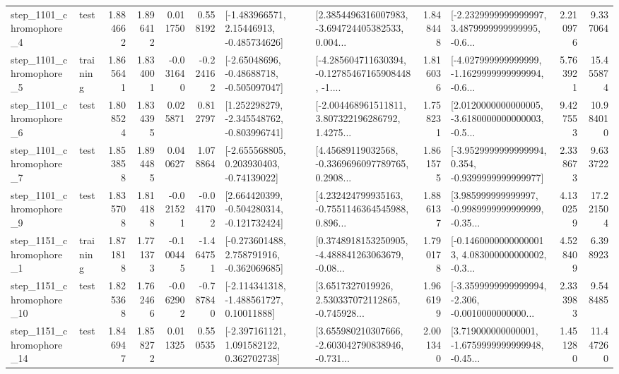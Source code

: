 \begin{tabular}{llrrrrllrlrr}
  step\_1101\_chromophore\_4 &      test &      1.884662 &    1.896412 &      0.011750 &  0.558192 &    [-1.483966571, 2.15446913, -0.485734626] &  [2.3854496316007983, -3.694724405382533, 0.004... &       1.848448 &  [-2.2329999999999997, 3.4879999999999995, -0.6... &            2.210976 &          9.337064 \\
  step\_1101\_chromophore\_5 &  training &      1.865641 &    1.834001 &     -0.031640 & -0.224162 &    [-2.65048696, -0.48688718, -0.505097047] &  [-4.285604711630394, -0.12785467165908448, -1.... &       1.816036 &  [-4.027999999999999, -1.1629999999999994, -0.6... &            5.763921 &         15.455874 \\
  step\_1101\_chromophore\_6 &      test &      1.808524 &    1.834395 &      0.025871 &  0.812797 &   [1.252298279, -2.345548762, -0.803996741] &  [-2.004468961511811, 3.807322196286792, 1.4275... &       1.758231 &  [2.0120000000000005, -3.6180000000000003, -0.5... &            9.427553 &         10.984010 \\
  step\_1101\_chromophore\_7 &      test &      1.853858 &    1.894485 &      0.040627 &  1.078864 &    [-2.655568805, 0.203930403, -0.74139022] &  [4.45689119032568, -0.3369696097789765, 0.2908... &       1.861575 &  [-3.9529999999999994, 0.354, -0.9399999999999977] &            2.338673 &          9.633722 \\
  step\_1101\_chromophore\_9 &      test &      1.835708 &    1.814188 &     -0.021521 & -0.041702 &   [2.664420399, -0.504280314, -0.121732424] &  [4.232424799935163, -0.7551146364545988, 0.896... &       1.886137 &  [3.985999999999997, -0.9989999999999999, -0.35... &            4.130259 &         17.221504 \\
  step\_1151\_chromophore\_1 &  training &      1.871818 &    1.771373 &     -0.100445 & -1.464751 &   [-0.273601488, 2.758791916, -0.362069685] &  [0.3748918153250905, -4.488841263063679, -0.08... &       1.790178 &  [-0.14600000000000013, 4.083000000000002, -0.3... &            4.528409 &          6.398923 \\
 step\_1151\_chromophore\_10 &      test &      1.825368 &    1.762466 &     -0.062902 & -0.787840 &    [-2.114341318, -1.488561727, 0.10011888] &  [3.6517327019926, 2.530337072112865, -0.745928... &       1.966199 &  [-3.3599999999999994, -2.306, -0.0010000000000... &            2.333983 &          9.548485 \\
 step\_1151\_chromophore\_14 &      test &      1.846947 &    1.858272 &      0.011325 &  0.550535 &    [-2.397161121, 1.091582122, 0.362702738] &  [3.655980210307666, -2.603042790838946, -0.731... &       2.001340 &  [3.719000000000001, -1.6759999999999948, -0.45... &            1.451280 &         11.447260 \\

\end{tabular}
